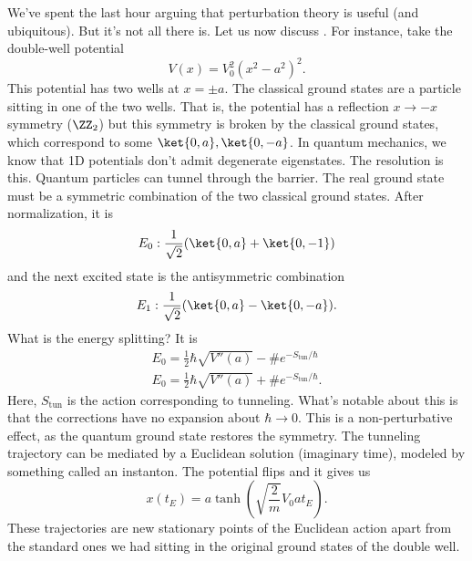 We've spent the last hour arguing that perturbation theory is useful (and ubiquitous). But it's not all there is. Let us now discuss . For instance, take the double-well potential
\begin{equation}
    V(x) = V_0^2 (x^2-a^2)^2.
\end{equation}
This potential has two wells at $x=\pm a$. The classical ground states are a particle sitting in one of the two wells. That is, the potential has a reflection $x\to -x$ symmetry ($\ZZ_2$) but this symmetry is broken by the classical ground states, which correspond to some $\ket{0,a},\ket{0,-a}$. In quantum mechanics, we know that 1D potentials don't admit degenerate eigenstates. The resolution is this. Quantum particles can tunnel through the barrier. The real ground state must be a symmetric combination of the two classical ground states. After normalization, it is
\begin{equation}
    E_0: \frac{1}{\sqrt{2}}( \ket{0,a}  +\ket{0,-1})
\end{equation}
and the next excited state is the antisymmetric combination
\begin{equation}
    E_1: \frac{1}{\sqrt{2}} (\ket{0,a} - \ket{0,-a}).
\end{equation}
What is the energy splitting? It is
\begin{align}
    E_0 = \frac{1}{2} \hbar \sqrt{V''(a)} - \#e^{-S_\text{tun}/\hbar}\\
    E_0 = \frac{1}{2} \hbar \sqrt{V''(a)} + \#e^{-S_\text{tun}/\hbar}.
\end{align}
Here, $S_\text{tun}$ is the action corresponding to tunneling. What's notable about this is that the corrections have no expansion about $\hbar \to 0$. This is a non-perturbative effect, as the quantum ground state restores the symmetry.
The tunneling trajectory can be mediated by a Euclidean solution (imaginary time), modeled by something called an instanton. The potential flips and it gives us
\begin{equation}
    x(t_E) = a\tanh(\sqrt{\frac{2}{m}}V_0 a t_E).
\end{equation}
These trajectories are new stationary points of the Euclidean action apart from the standard ones we had sitting in the original ground states of the double well.